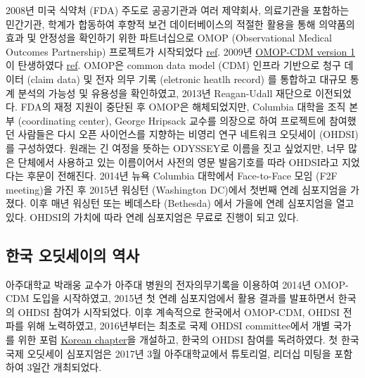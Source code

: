 \documentclass[]{book}
\begin{document}
2008년 미국 식약처 (FDA) 주도로 공공기관과 여러 제약회사, 의료기관을 포함하는 민간기관, 학계가 합동하여 후향적 보건 데이터베이스의 적절한 활용을 통해 의약품의 효과 및 안정성을 확인하기 위한 파트너십으로 OMOP (Observational Medical Outcomes Partnership) 프로젝트가 시작되었다 \href{https://fnih.org/what-we-do/major-completed-programs/omop}{ref}. 2009년 \href{http://forums.ohdsi.org/uploads/default/original/1X/7b3fb0f7acda70533b966d2834fef4ded62a97be.docx}{OMOP-CDM version 1}이 탄생하였다 \href{http://forums.ohdsi.org/t/is-omop-cdm-10-years-old-in-2017/3370/4}{ref}. OMOP은 common data model (CDM) 인프라 기반으로 청구 데이터 (claim data) 및 전자 의무 기록 (eletronic heatlh record) 를 통합하고 대규모 통계 분석의 가능성 및 유용성을 확인하였고, 2013년 Reagan-Udall 재단으로 이전되었다.
FDA의 재정 지원이 중단된 후 OMOP은 해체되었지만, Columbia 대학을 조직 본부 (coordinating center), George Hripsack 교수를 의장으로 하여 프로젝트에 참여했던 사람들은 다시 오픈 사이언스를 지향하는 비영리 연구 네트워크 오딧세이 (OHDSI) 를 구성하였다. 원래는 긴 여정을 뜻하는 ODYSSEY로 이름을 짓고 싶었지만, 너무 많은 단체에서 사용하고 있는 이름이어서 사전의 영문 발음기호를 따라 OHDSI라고 지었다는 후문이 전해진다.
2014년 뉴욕 Columbia 대학에서 Face-to-Face 모임 (F2F meeting)을 가진 후 2015년 워싱턴 (Washington DC)에서 첫번째 연례 심포지엄을 가졌다. 이후 매년 워싱턴 또는 베데스타 (Bethesda) 에서 가을에 연례 심포지엄을 열고 있다. OHDSI의 가치에 따라 연례 심포지엄은 무료로 진행이 되고 있다.

\hypertarget{OHDSIKoreaHistory}{%
\subsection{한국 오딧세이의 역사}\label{OHDSIKoreaHistory}}

아주대학교 박래웅 교수가 아주대 병원의 전자의무기록을 이용하여 2014년 OMOP-CDM 도입을 시작하였고, 2015년 첫 연례 심포지엄에서 활용 결과를 발표하면서 한국의 OHDSI 참여가 시작되었다. 이후 계속적으로 한국에서 OMOP-CDM, OHDSI 전파를 위해 노력하였고, 2016년부터는 최초로 국제 OHDSI committee에서 개별 국가를 위한 포럼 \href{http://forums.ohdsi.org/c/For-collaborators-wishing-to-communicate-in-Korean}{Korean chapter}을 개설하고, 한국의 OHDSI 참여를 독려하였다.
첫 한국 국제 오딧세이 심포지엄은 2017년 3월 아주대학교에서 튜토리얼, 리더십 미팅을 포함하여 3일간 개최되었다.
\end{document}
